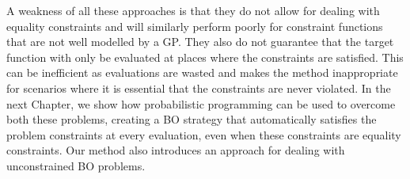A weakness of all these approaches is that they do not allow for dealing with equality constraints
and will similarly perform poorly for constraint functions that are not well modelled by a GP.  
They also do not guarantee that the target function with only be evaluated at places where the
constraints are satisfied.  This can be inefficient as evaluations are wasted and makes the method inappropriate
for scenarios where it is essential that the constraints are never violated.  
In the next Chapter, we show how
probabilistic programming can be used to overcome both these problems, creating a BO strategy that
automatically satisfies the problem constraints at every evaluation, even when these constraints
are equality constraints.  Our method also introduces an approach for dealing with
unconstrained BO problems.